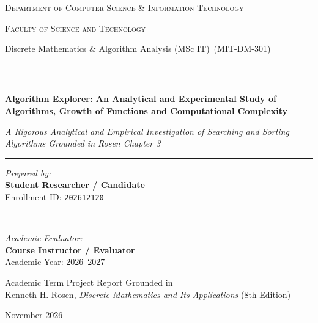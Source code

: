 \documentclass[11pt,a4paper,oneside]{report}
\newcommand{\DocUniversity}{Department of Computer Science \& Information Technology}
\newcommand{\DocFaculty}{Faculty of Science and Technology}
\newcommand{\DocCourse}{Discrete Mathematics \& Algorithm Analysis (MSc IT)}
\newcommand{\DocCourseCode}{MIT-DM-301}
\newcommand{\DocTitle}{Algorithm Explorer: An Analytical and Experimental Study of Algorithms, Growth of Functions and Computational Complexity}
\newcommand{\DocSubtitle}{A Rigorous Analytical and Empirical Investigation of Searching and Sorting Algorithms Grounded in Rosen Chapter 3}
\newcommand{\DocAuthor}{Student Researcher / Candidate}
\newcommand{\DocRollNumber}{202612120}
\newcommand{\DocSupervisor}{Course Instructor / Evaluator}
\newcommand{\DocAcademicYear}{2026--2027}
\newcommand{\DocSubmissionDate}{November 2026}
\theoremstyle{definition}
\begin{document}
\begin{titlepage}
    \centering
    \vspace*{1.0cm}
    
    {\scshape\Large \DocUniversity \par}
    \vspace{0.3cm}
    {\scshape\large \DocFaculty \par}
    \vspace{0.3cm}
    {\large \DocCourse\ (\DocCourseCode) \par}
    
    \vspace{1.5cm}
    \rule{\linewidth}{1.2pt}\\[0.4cm]
    {\huge\bfseries\color{primaryblue} \DocTitle \par}
    \vspace{0.3cm}
    {\large\itshape \DocSubtitle \par}
    \rule{\linewidth}{1.2pt}
    
    \vspace{2.0cm}
    
    \begin{minipage}{0.48\textwidth}
        \begin{flushleft} \large
            \emph{Prepared by:}\\
            \textbf{\DocAuthor}\\
            Enrollment ID: \texttt{\DocRollNumber}
        \end{flushleft}
    \end{minipage}
    ~
    \begin{minipage}{0.48\textwidth}
        \begin{flushright} \large
            \emph{Academic Evaluator:}\\
            \textbf{\DocSupervisor}\\
            Academic Year: \DocAcademicYear
        \end{flushright}
    \end{minipage}
    
    \vfill
    
    {\large Academic Term Project Report Grounded in\\
    Kenneth H. Rosen, \emph{Discrete Mathematics and Its Applications} (8th Edition)\par}
    \vspace{0.5cm}
    {\large \DocSubmissionDate \par}
\end{titlepage}
\end{document}
